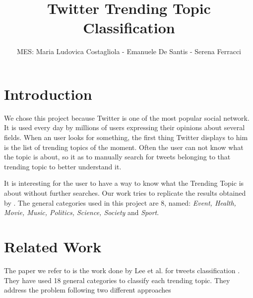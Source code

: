 \documentclass[journal,11pt]{vgtc}
\title{Twitter Trending Topic Classification}
\author{MES: Maria Ludovica Costagliola - Emanuele De Santis - Serena Ferracci}
\begin{document}
\maketitle

\section{Introduction}
We chose this project because Twitter is one of the most popular social network. 
It is used every day by millions of users expressing their opinions about several fields.
When an user looks for something, the first thing Twitter displays to him is the list of 
trending topics of the moment. Often the user can not know what the topic is about, so it as to manually 
search for tweets belonging to that trending topic to better understand it.

It is interesting for the user to have a way to know what the Trending Topic is about
without further searches.
Our work tries to replicate the results obtained by \cite{lee_palsetia_narayanan_patwary_agrawal_choudhary_2011}.  
The general categories used in this project are 8, named: \textit{Event, Health, Movie, Music, Politics, Science, Society} and \textit{Sport}.


\section{Related Work}
The paper we refer to is the work done by Lee et al. for tweets classification \cite{lee_palsetia_narayanan_patwary_agrawal_choudhary_2011}. 
They have used 18 general categories to classify each trending topic.
They address the problem following two different approaches 





\end{document}
